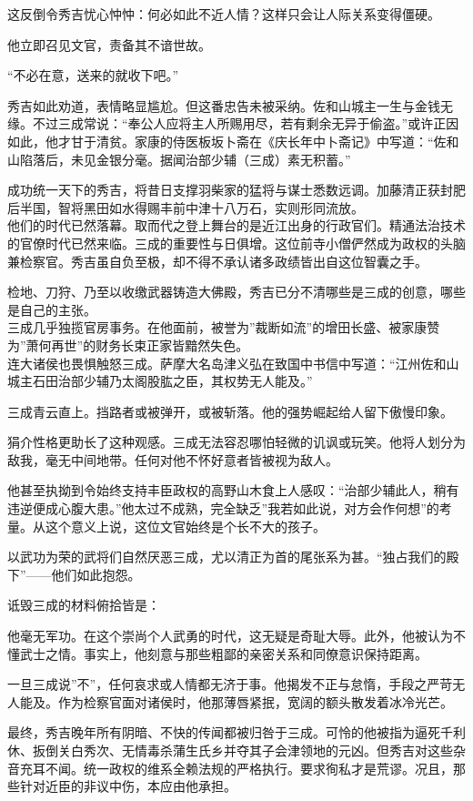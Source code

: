 \documentclass[
]{book}
\begin{document}
这反倒令秀吉忧心忡忡：何必如此不近人情？这样只会让人际关系变得僵硬。

他立即召见文官，责备其不谙世故。

``不必在意，送来的就收下吧。''

秀吉如此劝道，表情略显尴尬。但这番忠告未被采纳。佐和山城主一生与金钱无缘。不过三成常说：``奉公人应将主人所赐用尽，若有剩余无异于偷盗。''或许正因如此，他才甘于清贫。家康的侍医板坂卜斋在《庆长年中卜斋记》中写道：``佐和山陷落后，未见金银分毫。据闻治部少辅（三成）素无积蓄。''

成功统一天下的秀吉，将昔日支撑羽柴家的猛将与谋士悉数远调。加藤清正获封肥后半国，智将黑田如水得赐丰前中津十八万石，实则形同流放。\\
他们的时代已然落幕。取而代之登上舞台的是近江出身的行政官们。精通法治技术的官僚时代已然来临。三成的重要性与日俱增。这位前寺小僧俨然成为政权的头脑兼检察官。秀吉虽自负至极，却不得不承认诸多政绩皆出自这位智囊之手。

检地、刀狩、乃至以收缴武器铸造大佛殿，秀吉已分不清哪些是三成的创意，哪些是自己的主张。\\
三成几乎独揽官房事务。在他面前，被誉为''裁断如流''的增田长盛、被家康赞为''萧何再世''的财务长束正家皆黯然失色。\\
连大诸侯也畏惧触怒三成。萨摩大名岛津义弘在致国中书信中写道：``江州佐和山城主石田治部少辅乃太阁股肱之臣，其权势无人能及。''

三成青云直上。挡路者或被弹开，或被斩落。他的强势崛起给人留下傲慢印象。

狷介性格更助长了这种观感。三成无法容忍哪怕轻微的讥讽或玩笑。他将人划分为敌我，毫无中间地带。任何对他不怀好意者皆被视为敌人。

他甚至执拗到令始终支持丰臣政权的高野山木食上人感叹：``治部少辅此人，稍有违逆便成心腹大患。''他太过不成熟，完全缺乏''我若如此说，对方会作何想''的考量。从这个意义上说，这位文官始终是个长不大的孩子。

以武功为荣的武将们自然厌恶三成，尤以清正为首的尾张系为甚。``独占我们的殿下''------他们如此抱怨。

诋毁三成的材料俯拾皆是：

他毫无军功。在这个崇尚个人武勇的时代，这无疑是奇耻大辱。此外，他被认为不懂武士之情。事实上，他刻意与那些粗鄙的亲密关系和同僚意识保持距离。

一旦三成说''不''，任何哀求或人情都无济于事。他揭发不正与怠惰，手段之严苛无人能及。作为检察官面对诸侯时，他那薄唇紧抿，宽阔的额头散发着冰冷光芒。

最终，秀吉晚年所有阴暗、不快的传闻都被归咎于三成。可怜的他被指为逼死千利休、扳倒关白秀次、无情毒杀蒲生氏乡并夺其子会津领地的元凶。但秀吉对这些杂音充耳不闻。统一政权的维系全赖法规的严格执行。要求徇私才是荒谬。况且，那些针对近臣的非议中伤，本应由他承担。
\end{document}
